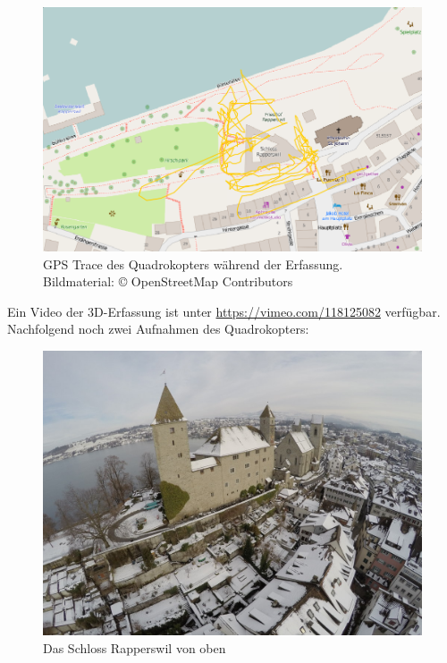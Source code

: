 \begin{figure}[H]
	\centering
	\includegraphics[width=\textwidth]{images/gpstrace_mapnik.png}
	\caption{GPS Trace des Quadrokopters während der Erfassung.\\Bildmaterial:
		\copyright{} OpenStreetMap Contributors}
	\label{img:gpstrace-mapnik}
\end{figure}

Ein Video der 3D-Erfassung ist unter \url{https://vimeo.com/118125082}
verfügbar. Nachfolgend noch zwei Aufnahmen des Quadrokopters:

\begin{figure}[H]
	\centering
	\includegraphics[width=\textwidth]{images/drone-pic-1.jpg}
	\caption{Das Schloss Rapperswil von oben}
	\label{img:drone-pic-1}
\end{figure}

